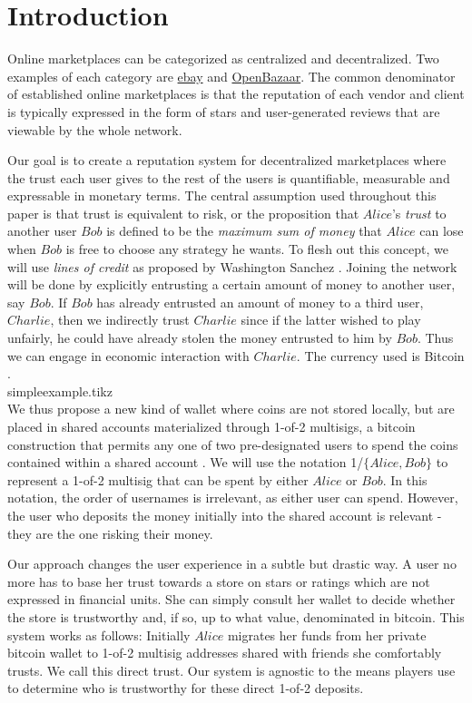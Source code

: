 \section{Introduction}
   Online marketplaces can be categorized as centralized and decentralized.
   Two examples of each category are \href{http://www.ebay.com}{ebay} and \href{https://openbazaar.org/}{OpenBazaar}.
   The common denominator of established online marketplaces is that the reputation of each vendor and client is typically
   expressed in the form of stars and user-generated reviews that are viewable by the whole network.

   Our goal is to create a reputation system for decentralized marketplaces where the trust each user gives to the rest of the users is
   quantifiable, measurable and expressable in monetary terms. The central assumption used throughout this paper is
   that trust is equivalent to risk, or the proposition that $Alice$'s \textit{trust} to another user $Bob$ is defined to
   be the \textit{maximum sum of money} that $Alice$ can lose when $Bob$ is free to choose any strategy he wants. To flesh
   out this concept, we will use \textit{lines of credit} as proposed by Washington Sanchez \cite{loc}.
   Joining the network
   will be done by explicitly entrusting a certain amount of money to another user, say $Bob$. If $Bob$ has already
   entrusted an amount of money to a third user, $Charlie$, then we indirectly trust $Charlie$ since if the latter wished
   to play unfairly, he could have already stolen the money entrusted to him by $Bob$. Thus we can engage in economic
   interaction with $Charlie$. The currency used is Bitcoin \cite{bitcoin}. \medskip \ \\
   {simpleexample.tikz} \smallskip \ \\
   We thus propose a new kind of wallet where coins are not stored locally, but are placed in shared accounts materialized
   through 1-of-2 multisigs, a bitcoin
   construction that permits any one of two pre-designated users to spend the coins contained within a shared account
   \cite{masteringbitcoin}. We will use the notation 1/$\{Alice, Bob\}$ to represent a 1-of-2 multisig that can be spent by
   either $Alice$ or $Bob$. In this notation, the order of usernames is irrelevant, as either user can spend. However, the
   user who deposits the money initially into the shared account is relevant - they are the one risking their money.

   Our approach changes the user experience in a subtle but drastic way. A user no more has to base her trust towards a
   store on stars or ratings which are not expressed in financial units. She can simply consult her wallet to
   decide whether the store is trustworthy and, if so, up to what value, denominated in bitcoin. This system works as follows:
   Initially $Alice$
   migrates her funds from her private bitcoin wallet to 1-of-2 multisig addresses shared with
   friends she comfortably trusts. We call this direct trust. Our system is agnostic to the means players use to determine
   who is trustworthy for these direct 1-of-2 deposits.

